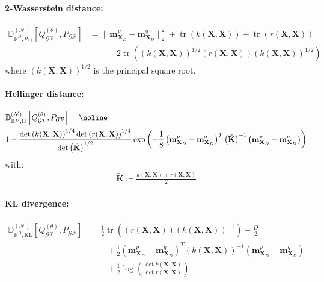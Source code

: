 \documentclass{article}
\newcommand{\tr}{\operatorname{tr}}
\newcommand{\GP}{\operatorname{\mathcal{GP}}}
\numberwithin{equation}{section}
\begin{document}
\paragraph{2-Wasserstein distance:}
\begin{align}
    \mathbb{D}_{\mathbb{R}^D, \text{W}_2}^{(\mathcal{N})} \left[Q_{\GP}^{(\theta)}, P_{\GP}\right] &= \|\mathbf{m}_{\mathbf{X}_D}^p - \mathbf{m}_{\mathbf{X}_D}^q\|_2^2 + \tr \left(k(\mathbf{X}, \mathbf{X})\right) + \tr \left(r(\mathbf{X}, \mathbf{X})\right) \nonumber \\
    & \qquad - 2 \tr\left(\left(k(\mathbf{X}, \mathbf{X})\right)^{1/2}\left(r(\mathbf{X}, \mathbf{X})\right)\left(k(\mathbf{X}, \mathbf{X})\right)^{1/2}\right)
\end{align}
where $\left(k(\mathbf{X}, \mathbf{X})\right)^{1/2}$ is the principal square root.

\paragraph{Hellinger distance:}
\begin{align}
    & \mathbb{D}_{\mathbb{R}^D, \text{H}}^{(\mathcal{N})} \left[Q_{\GP}^{(\theta)}, P_{\GP}\right] = \noline \\
    & 1 - \frac{\det\left(k(\mathbf{X}, \mathbf{X})\right)^{1/4}\det\left(r(\mathbf{X}, \mathbf{X})\right)^{1/4}}{\det\left(\tilde{\textbf{K}}\right)^{1/2}}\exp\left(-\frac{1}{8}\left(\mathbf{m}_{\mathbf{X}_D}^p - \mathbf{m}_{\mathbf{X}_D}^q\right)^T \left(\tilde{\textbf{K}}\right)^{-1}\left(\mathbf{m}_{\mathbf{X}_D}^p - \mathbf{m}_{\mathbf{X}_D}^q\right)\right)
\end{align}
with:
\begin{align}
    \tilde{\textbf{K}} \coloneqq \frac{ k(\mathbf{X}, \mathbf{X}) +  r(\mathbf{X}, \mathbf{X})}{2}
\end{align}

\paragraph{KL divergence:}
\begin{align}
    \mathbb{D}_{\mathbb{R}^D, \text{KL}}^{(\mathcal{N})} \left[Q_{\GP}^{(\theta)}, P_{\GP}\right] &= \frac{1}{2}\tr\left(\left(r(\mathbf{X}, \mathbf{X}) \right)\left(k(\mathbf{X}, \mathbf{X})\right)^{-1}\right) -\frac{D}{2}\nonumber \\
    & \qquad  +\frac{1}{2}  \left(\mathbf{m}_{\mathbf{X}_D}^p - \mathbf{m}_{\mathbf{X}_D}^q\right)^T \left( k(\mathbf{X}, \mathbf{X})\right)^{-1}\left(\mathbf{m}_{\mathbf{X}_D}^p - \mathbf{m}_{\mathbf{X}_D}^q\right) \nonumber \\
    & \qquad + \frac{1}{2} \log\left(\frac{\det k(\mathbf{X}, \mathbf{X})}{\det r(\mathbf{X}, \mathbf{X})}\right)
\end{align}
\end{document}
